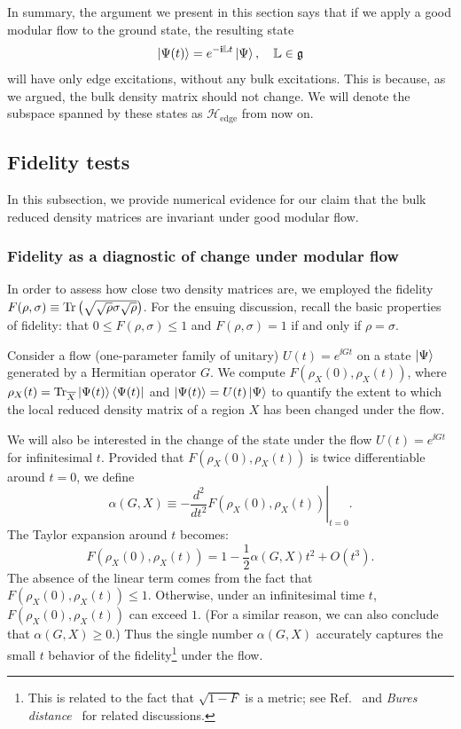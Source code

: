 \documentclass[12pt, nofootinbib]{article}
\theoremstyle{plain}
\theoremstyle{assumption}
\theoremstyle{definition}
\theoremstyle{plain}
\theoremstyle{plain}
\theoremstyle{plain}
\theoremstyle{plain}
\theoremstyle{plain}
\def\Lb{\mathbb{L}}
\begin{document}
In summary, the argument we present in this section says that if we apply a good modular flow to the ground state, the resulting state
\begin{equation}\label{eq:invariant-subspace?}
    \ket{\Psi(t)} = e^{-\ii\Lb t}\ket{\Psi},\quad \Lb \in \mathfrak{g}
\end{equation}
will have only edge excitations, without any bulk excitations. This is because, as we argued, the bulk density matrix should not change. We will denote the subspace spanned by these states as $\mathcal{H}_{\text{edge}}$ from now on. 

\subsection{Fidelity tests}
\label{sec:fidelity_tests}
In this subsection, we provide numerical evidence for our claim that the bulk reduced density matrices are invariant under good modular flow. 

\subsubsection{Fidelity as a diagnostic of change under modular flow}\label{sec:fid-general} 

In order to assess how close two density matrices are, we employed the fidelity $F(\rho,\sigma)\equiv {{\rm Tr}}\left( \sqrt{\sqrt{\rho}\sigma\sqrt{\rho}} \right)$.  
For the ensuing discussion, recall the basic properties of fidelity: that $0\leq F(\rho,\sigma)\leq 1$ and $F(\rho,\sigma) = 1$ if and only if $\rho=\sigma$.  

Consider a flow (one-parameter family of unitary) $U(t) = e^{\ii Gt}$ on a state $\left|\Psi\right\rangle$ generated by a Hermitian operator $G$. We compute $F(\rho_X(0),\rho_X(t))$, where $\rho_X(t) = {{\rm Tr}}_{\overline{X}}\left|\Psi(t)\right\rangle\left\langle\Psi(t)\right|$ and $\left|\Psi(t)\right\rangle = U(t)\left|\Psi\right\rangle$ to quantify the extent to which the local reduced density matrix of a region $X$ has been changed under the flow. 

We will also be interested in the change of the state under the flow $U(t) = e^{\ii Gt}$ for infinitesimal $t$. 
Provided that $F(\rho_X(0),\rho_X(t))$ is twice differentiable around $t=0$, we define 
\begin{equation}\label{eq:alpha}
    \alpha(G,X) \equiv  -\left. \frac{d^2}{dt^2} F(\rho_X(0),\rho_X(t)) \right|_{t=0}.
\end{equation}
The Taylor expansion around $t$ becomes: 
\begin{equation}\label{eq:f-smallt}
    F(\rho_X(0),\rho_X(t)) = 1 - \frac{1}{2}\alpha(G,X)t^2 + O(t^3).  
\end{equation}
The absence of the linear term comes from the fact that $F(\rho_X(0),\rho_X(t))\leq 1$. Otherwise, under an infinitesimal time $t$, $F(\rho_X(0),\rho_X(t))$ can exceed $1$. (For a similar reason, we can also conclude that $\alpha(G,X) \geq 0$.) Thus the single number $\alpha(G,X)$ accurately captures the small $t$ behavior of the fidelity\footnote{This is related to the fact that $\sqrt{1-F}$ is a metric; see Ref.~\cite{Fidelity-2008} and \emph{Bures distance}~\cite{Bures1969} for related discussions.} under the flow. 
\end{document}

